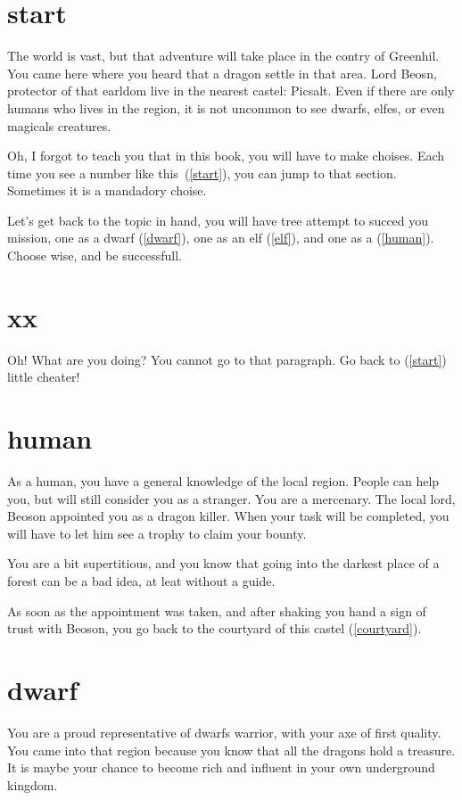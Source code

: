 \section{start}

The world is vast, but that adventure will take place in
the contry of Greenhil. You came here where you heard that a dragon settle in
that area. Lord Beosn, protector of that earldom live in the nearest castel:
Picsalt. Even if there are only humans who lives in the region, it is not
uncommon to see dwarfs, elfes, or even magicals creatures.

Oh, I forgot to teach you that in this book, you will have to make choises. Each
time you see a number like this~(\ref{start}), you can jump to that section.
Sometimes it is a mandadory choise.

Let's get back to the topic in hand, you will have tree attempt to succed you
mission, one as a dwarf (\ref{dwarf}), one as an elf (\ref{elf}), and one as a
(\ref{human}). Choose wise, and be successfull.

\section{xx}

Oh! What are you doing? You cannot go to that paragraph. Go back to
(\ref{start}) little cheater!

\section{human}

As a human, you have a general knowledge of the local region. People can help
you, but will still consider you as a stranger. You are a mercenary. The local
lord, Beoson appointed you as a dragon killer. When your task will be completed,
you will have to let him see a trophy to claim your bounty.

You are a bit supertitious, and you know that going into the darkest place
of a forest can be a bad idea, at leat without a guide.

As soon as the appointment was taken, and after shaking you hand a sign of trust
with Beoson, you go back to the courtyard of this castel (\ref{courtyard}).

\section{dwarf}

You are a proud representative of dwarfs warrior, with your axe of first
quality. You came into that region because you know that all the dragons hold a
treasure. It is maybe your chance to become rich and influent in your own
underground kingdom.

